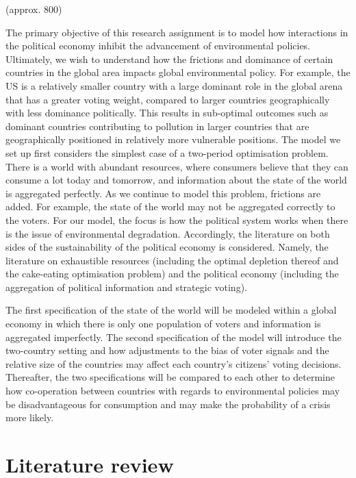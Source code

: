 \documentclass[11pt,preprint, authoryear]{elsarticle}
\numberwithin{equation}{section}
\numberwithin{figure}{section}
\numberwithin{table}{section}
\begin{document}
(approx. 800)

The primary objective of this research assignment is to model how
interactions in the political economy inhibit the advancement of
environmental policies. Ultimately, we wish to understand how the
frictions and dominance of certain countries in the global area impacts
global environmental policy. For example, the US is a relatively smaller
country with a large dominant role in the global arena that has a
greater voting weight, compared to larger countries geographically with
less dominance politically. This results in sub-optimal outcomes such as
dominant countries contributing to pollution in larger countries that
are geographically positioned in relatively more vulnerable positions.
The model we set up first considers the simplest case of a two-period
optimisation problem. There is a world with abundant resources, where
consumers believe that they can consume a lot today and tomorrow, and
information about the state of the world is aggregated perfectly. As we
continue to model this problem, frictions are added. For example, the
state of the world may not be aggregated correctly to the voters. For
our model, the focus is how the political system works when there is the
issue of environmental degradation. Accordingly, the literature on both
sides of the sustainability of the political economy is considered.
Namely, the literature on exhaustible resources (including the optimal
depletion thereof and the cake-eating optimisation problem) and the
political economy (including the aggregation of political information
and strategic voting).

The first specification of the state of the world will be modeled within
a global economy in which there is only one population of voters and
information is aggregated imperfectly. The second specification of the
model will introduce the two-country setting and how adjustments to the
bias of voter signals and the relative size of the countries may affect
each country's citizens' voting decisions. Thereafter, the two
specifications will be compared to each other to determine how
co-operation between countries with regards to environmental policies
may be disadvantageous for consumption and may make the probability of a
crisis more likely.

\hypertarget{literature-review}{%
\section{Literature review}\label{literature-review}}
\end{document}
